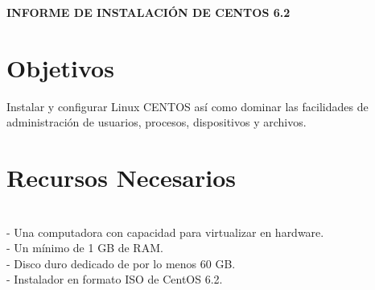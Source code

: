 
\begin{Large}
\begin{center}
\textbf{INFORME DE INSTALACIÓN DE CENTOS 6.2} \\
\end{center}
\end{Large}

\section{Objetivos} 


\begin{itemize}

Instalar y configurar Linux CENTOS así como dominar las facilidades de administración de usuarios, procesos, dispositivos y archivos.\\

\end{itemize} 

\section{Recursos Necesarios} 

\begin{itemize}
\\- Una computadora con capacidad para virtualizar en hardware. 
\\-	Un mínimo de 1 GB de RAM.
\\-	Disco duro dedicado de por lo menos 60 GB.
\\-	Instalador en formato ISO de CentOS 6.2.
\\\
\end{itemize} 

